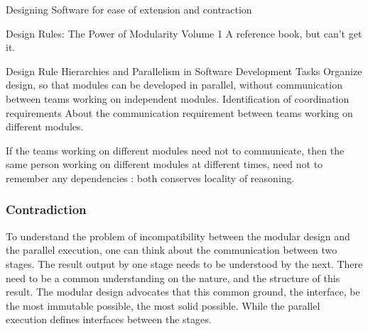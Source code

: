 Designing Software for ease of extension and contraction \cite{Parnas1979}

Design Rules: The Power of Modularity Volume 1 \cite{Baldwin1999}
A reference book, but can't get it.

Design Rule Hierarchies and Parallelism in Software Development Tasks \cite{Wong2009}
Organize design, so that modules can be developed in parallel, without communication between teams working on independent modules.
Identification of coordination requirements \cite{Cataldo2006}
About the communication requirement between teams working on different modules.

If the teams working on different modules need not to communicate, then the same person working on different modules at different times, need not to remember any dependencies : both conserves locality of reasoning.

















\subsubsection{Contradiction}


To understand the problem of incompatibility between the modular design and the parallel execution, one can think about the communication between two stages.
The result output by one stage needs to be understood by the next.
There need to be a common understanding on the nature, and the structure of this result.
The modular design advocates that this common ground, the interface, be the most immutable possible, the most solid possible.
While the parallel execution defines interfaces between the stages.



\endinput

Since the beginning of software development, software systems are designed as the composition of smaller subsystems.\nt{Find exact reference of this}

The first one follows the Information Hiding principle, firstly stated by Parnas, in 1972 in his paper On the criteria to be used in decomposing systems into modules.

Dijkstra coined the term hierarchical structure in a paper presenting the decomposition of a multiprogramming system.
Basically what we could consider a simple operating system.

